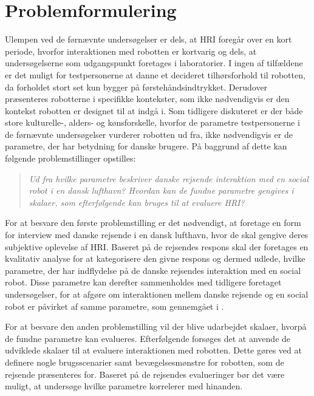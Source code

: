 \section{Problemformulering}
\label{Problemformulering}
%
Ulempen ved de førnævnte undersøgelser er dels, at HRI foregår over en kort periode, hvorfor interaktionen med robotten er kortvarig og dels, at undersøgelserne som udgangspunkt foretages i laboratorier. I ingen af tilfældene er det muligt for testpersonerne at danne et decideret tilhørsforhold til robotten, da forholdet stort set kun bygger på førstehåndsindtrykket. Derudover præsenteres robotterne i specifikke kontekster, som ikke nødvendigvis er den kontekst robotten er designet til at indgå i. Som tidligere diskuteret er der både store kulturelle-, alders- og kønsforskelle, hvorfor de parametre testpersonerne i de førnævnte undersøgelser vurderer robotten ud fra, ikke nødvendigvis er de parametre, der har betydning for danske brugere. På baggrund af dette kan følgende problemstillinger opstilles:\blankline
%
\begin{quotation}
	\noindent
	\textit{Ud fra hvilke parametre beskriver danske rejsende interaktion med en social robot i en dansk lufthavn?\blankline
		Hvordan kan de fundne parametre gengives i skalaer, som efterfølgende kan bruges til at evaluere HRI?}\blankline
\end{quotation}
%
For at besvare den første problemstilling er det nødvendigt, at foretage en form for interview med danske rejsende i en dansk lufthavn, hvor de skal gengive deres subjektive oplevelse af HRI. Baseret på de rejsendes respons skal der foretages en kvalitativ analyse for at kategorisere den givne respons og dermed udlede, hvilke parametre, der har indflydelse på de danske rejsendes interaktion med en social robot. Disse parametre kan derefter sammenholdes med tidligere foretaget undersøgelser, for at afgøre om interaktionen mellem danske rejsende og en social robot er påvirket af samme parametre, som gennemgået i . 

For at besvare den anden problemstilling vil der blive udarbejdet skalaer, hvorpå de fundne parametre kan evalueres. Efterfølgende forsøges det at anvende de udviklede skalaer til at evaluere interaktionen med robotten. Dette gøres ved at definere nogle brugsscenarier samt bevægelsesmønstre for robotten, som de rejsende præsenteres for. Baseret på de rejsendes evalueringer bør det være muligt, at undersøge hvilke parametre korrelerer med hinanden. 


